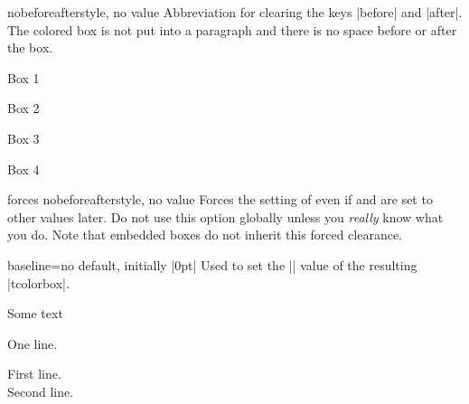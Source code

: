 \begin{docTcbKey}{nobeforeafter}{}{style, no value}
  Abbreviation for clearing the keys |before| and |after|. The colored box
  is not put into a paragraph and there is no space before or after the box.
\begin{dispExample}
\begin{tcolorbox}[myone,title=Box 1]Box 1\end{tcolorbox}%
\begin{tcolorbox}[myone,title=Box 2]Box 2\end{tcolorbox}%
\begin{tcolorbox}[myone,title=Box 3]Box 3\end{tcolorbox}%
\begin{tcolorbox}[myone,title=Box 4]Box 4\end{tcolorbox}
\end{dispExample}
\end{docTcbKey}

\enlargethispage*{1cm}
\begin{docTcbKey}{forces nobeforeafter}{}{style, no value}
  Forces the setting of  even if
   and  are set to other values
  later. Do not use this option globally unless you \emph{really} know what you do.
  Note that embedded boxes do not inherit this forced clearance.
\end{docTcbKey}


\clearpage

\begin{docTcbKey}{baseline}{=}{no default, initially |0pt|}
  Used to set the |\pgfsetbaseline| value of the resulting |tcolorbox|.
\begin{dispExample}
Some text\dotfill
\begin{tcolorbox}[baseline=3mm]
One line.
\end{tcolorbox}
\begin{tcolorbox}[baseline=3mm]
First line.\\Second line.
\end{tcolorbox}
\end{dispExample}
\end{docTcbKey}


